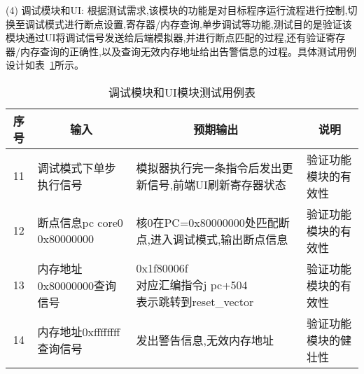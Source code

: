 (4) 调试模块和UI: 根据测试需求,该模块的功能是对目标程序运行流程进行控制,切换至调试模式进行断点设置,寄存器/内存查询,单步调试等功能,测试目的是验证该模块通过UI将调试信号发送给后端模拟器,并进行断点匹配的过程,还有验证寄存器/内存查询的正确性,以及查询无效内存地址给出告警信息的过程。具体测试用例设计如表~\ref{tab:test4}所示。
\begin{table}[h]
    \centering
    \caption{调试模块和UI模块测试用例表}
    \label{tab:test4}
    \renewcommand\arraystretch{1.2}
    \begin{tabular}{clll}
      \toprule
      \multicolumn{1}{c}{序号} & \multicolumn{1}{c}{输入} & \multicolumn{1}{c}{预期输出} &\multicolumn{1}{c}{说明}\\
      \midrule
  11	& \multicolumn{1}{m{3cm}}{调试模式下单步执行信号} & \multicolumn{1}{m{4cm}}{模拟器执行完一条指令后发出更新信号,前端UI刷新寄存器状态} & \multicolumn{1}{m{3.5cm}}{验证功能模块的有效性}\\
  \hline
  12	& \multicolumn{1}{m{3cm}}{断点信息pc core0 0x80000000} & \multicolumn{1}{m{4cm}}{核0在PC=0x80000000处匹配断点,进入调试模式,输出断点信息} & \multicolumn{1}{m{3.5cm}}{验证功能模块的有效性}\\
  \hline
  13	& \multicolumn{1}{m{3cm}}{内存地址0x80000000查询信号} & \makecell[l]{0x1f80006f\\
  对应汇编指令j pc+504\\
  表示跳转到reset\_vector
  } & \multicolumn{1}{m{3.5cm}}{验证功能模块的有效性}\\
  \hline
  14	& \multicolumn{1}{m{3cm}}{内存地址0xffffffff查询信号} & \multicolumn{1}{m{4cm}}{发出警告信息,无效内存地址} & \multicolumn{1}{m{3.5cm}}{验证功能模块的健壮性}\\
      \bottomrule
    \end{tabular}
\end{table}

